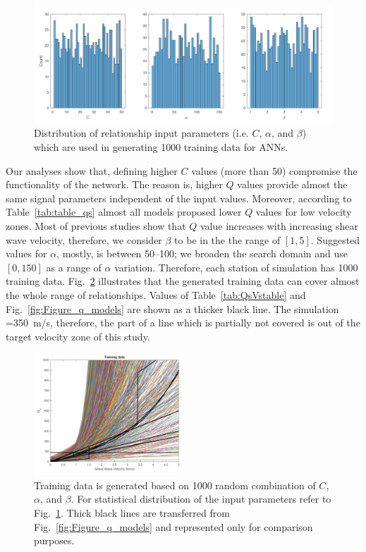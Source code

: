  \begin{figure}[ht]
    \centering
    \includegraphics[width=\textwidth]{figures/pdf/Figure_09.pdf}
    \caption{Distribution of \qsvs{} relationship input parameters (i.e. $C$, $\alpha$, and $\beta$) which are used in generating 1000 training data for ANNs.}
    \label{fig:Figure_training_data_statistics}
\end{figure}

 Our analyses show that, defining higher $C$ values (more than 50) compromise the functionality of the network. The reason is, higher $Q$ values provide almost the same signal parameters independent of the input values. Moreover, according to Table~\ref{tab:table_qs} almost all models proposed lower $Q$ values for low velocity zones. Most of previous studies show that $Q$ value increases with increasing shear wave velocity, therefore, we consider $\beta$ to be in the the range of $[1,5]$. Suggested values for $\alpha$, mostly, is between 50--100; we broaden the search domain and use $[0,150]$ as a range of $\alpha$ variation. Therefore, each station of simulation has 1000 training data. Fig.~\ref{fig:Figure_training_data} illustrates that the generated training data can cover almost the whole range of \qsvs{} relationships. Values of Table~\ref{tab:QsVstable} and Fig.~\ref{fig:Figure_q_models} are shown as a thicker black line. The simulation \vsmin{}=350~m/s, therefore, the part of a line which is partially not covered is out of the target velocity zone of this study. 

 \begin{figure}[ht]
    \centering
    \includegraphics[width=0.5\textwidth]{figures/pdf/Figure_10.pdf}
    \caption{Training data is generated based on 1000 random combination of $C$, $\alpha$, and $\beta$. For statistical distribution of the input parameters refer to Fig.~\ref{fig:Figure_training_data_statistics}. Thick black lines are transferred from Fig.~\ref{fig:Figure_q_models} and represented only for comparison purposes.}
    \label{fig:Figure_training_data}
\end{figure}


